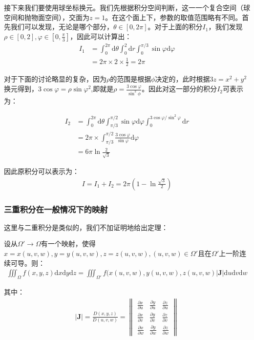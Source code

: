\documentclass{ctexart}
\begin{document}
接下来我们要使用球坐标换元。我们先根据积分空间判断，这一一个复合空间（球空间和抛物面空间），交面为$z=1$。在这个面上下，参数的取值范围略有不同。首先我们可以发现，无论是哪个部分，$\theta\in[0,2\pi]$。对于上面的积分$I_1$，我们发现$\rho\in[0,2],\varphi\in[0,\frac{\pi}{3}]$，因此可以计算出：
\begin{align*}   I_1&=\int_0^{2\pi}\mathrm{d}\theta\int_0^2\mathrm{d}r\int_0^{\pi/3} \sin\varphi\mathrm{d}\varphi 
\\&= 2\pi\times2\times \frac{1}{2}=2\pi 
\end{align*}

对于下面的讨论略显的复杂，因为$\rho$的范围是根据$\phi$决定的，此时根据$3z=x^2+y^2$换元得到，$3\cos\varphi=\rho\sin\varphi^2$,即就是$\rho=\frac{3\cos\varphi}{\sin^2\phi}$。因此对这一部分的积分$I_2$可表示为：

\begin{align*} I_2&=\int_0^{2\pi}\mathrm{d}\theta\int_{\pi/3}^{\pi/2} \sin\varphi\mathrm{d}\varphi 
\int_0^{3\cos\varphi/\sin^2\varphi }\mathrm{d}r
\\&= 2\pi\times \int_{\pi/3}^{\pi/2} \frac{3\cos\varphi }{\sin\varphi} \mathrm{d}\varphi
\\&=6\pi\ln\frac{2}{\sqrt{3}} 
\end{align*}

因此原积分可以表示为：
\begin{align*}
    I=I_1+I_2=2\pi\left(1-\ln\frac{\sqrt{3}}{2}\right)
\end{align*}

\subsubsection{三重积分在一般情况下的映射}
这里与二重积分是类似的，我们不加证明地给出定理：
\begin{tcolorbox}[
    colback=bac2,     %
    colframe=fra2,   %
    coltitle=white,             %
    coltext=tex2,
    title=三重积分在一般情况下的映射,
    fonttitle=\bfseries,        %
arc=3mm,                     %
breakable
]
设从$\Omega'\to\Omega$有一个映射，使得$x=x(u,v,w),y=y(u,v,w),z=z(u,v,w),(u,v,w)\in\Omega'\text{且在}\Omega'$上一阶连续可导。则：
\begin{align*}
   \iiint_\Omega f(x,y,z)\mathrm{d}x\mathrm{d}y\mathrm{d}z=\iiint_{\Omega'}
f(x(u,v,w),y(u,v,w),z(u,v,w)|\bm{J} |\mathrm{d}u\mathrm{d}v\mathrm{d}w\tag{1-15}
\end{align*}

其中：
\begin{align*}
    |\bm{J} |=\frac{D(x,y,z)}{D(u,v,w)}=\begin{Vmatrix}
 \frac{\partial x}{\partial u} & \frac{\partial y}{\partial u} & \frac{\partial z}{\partial u}\\
 \frac{\partial x}{\partial v} &\frac{\partial y}{\partial v}  &\frac{\partial z}{\partial v} \\
 \frac{\partial x}{\partial w} & \frac{\partial y}{\partial w} &\frac{\partial z}{\partial w}
\end{Vmatrix} \tag{1-16}
\end{align*}
\end{tcolorbox}
\end{document}
